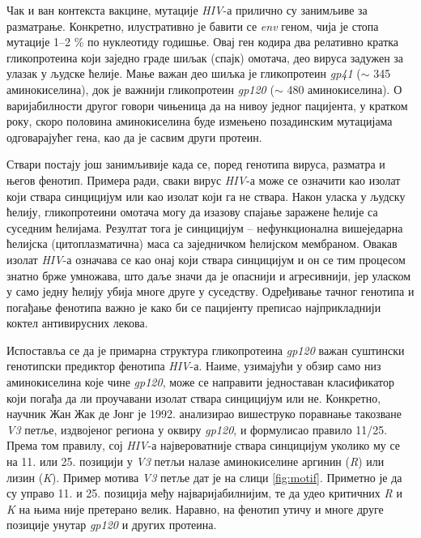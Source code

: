 \documentclass[12pt,oneside]{memoir}
\begin{document}
\begin{CJK}{UTF8}{ipxm}
Чак и ван контекста вакцине, мутације \textit{HIV}-а прилично су занимљиве за разматрање. Конкретно, илустративно је бавити се \textit{env} геном, чија је стопа мутације 1--2 \% по нуклеотиду годишње. Овај ген кодира два релативно кратка гликопротеина који заједно граде шиљак (спајк) омотача, део вируса задужен за улазак у људске ћелије. Мање важан део шиљка је гликопротеин \textit{gp41} ($\sim$ 345 аминокиселина), док је важнији гликопротеин \textit{gp120} ($\sim$ 480 аминокиселина). О варијабилности другог говори чињеница да на нивоу једног пацијента, у кратком року, скоро половина аминокиселина буде измењено позадинским мутацијама одговарајућег гена, као да је сасвим други протеин.

Ствари постају још занимљивије када се, поред генотипа вируса, разматра и његов фенотип. Примера ради, сваки вирус \textit{HIV}-а може се означити као изолат који ствара синцицијум или као изолат који га не ствара. Након уласка у људску ћелију, гликопротеини омотача могу да изазову спајање заражене ћелије са суседним ћелијама. Резултат тога је синцицијум -- нефункционална вишеједарна ћелијска (цитоплазматична) маса са заједничком ћелијском мембраном. Овакав изолат \textit{HIV}-а означава се као онај који ствара синцицијум и он се тим процесом знатно брже умножава, што даље значи да је опаснији и агресивнији, јер уласком у само једну ћелију убија многе друге у суседству. Одређивање тачног генотипа и погађање фенотипа важно је како би се пацијенту преписао најприкладнији коктел антивирусних лекова.

Испоставља се да је примарна структура гликопротеина \textit{gp120} важан суштински генотипски предиктор фенотипа \textit{HIV}-а. Наиме, узимајући у обзир само низ аминокиселина које чине \textit{gp120}, може се направити једноставан класификатор који погађа да ли проучавани изолат ствара синцицијум или не. Конкретно, научник Жан Жак де Јонг је 1992. анализирао вишеструко поравнање такозване \textit{V3} петље, издвојеног региона у оквиру \textit{gp120}, и формулисао правило 11/25\cite{jong1992}. Према том правилу, сој \textit{HIV}-а највероватније ствара синцицијум уколико му се на 11. или 25. позицији у \textit{V3} петљи налазе аминокиселине аргинин (\textit{R}) или лизин (\textit{K}). Пример мотива \textit{V3} петље дат је на слици \ref{fig:motif}. Приметно је да су управо 11. и 25. позиција међу најваријабилнијим, те да удео критичних \textit{R} и \textit{K} на њима није претерано велик. Наравно, на фенотип утичу и многе друге позиције унутар \textit{gp120} и других протеина.


\end{CJK}
\end{document}
